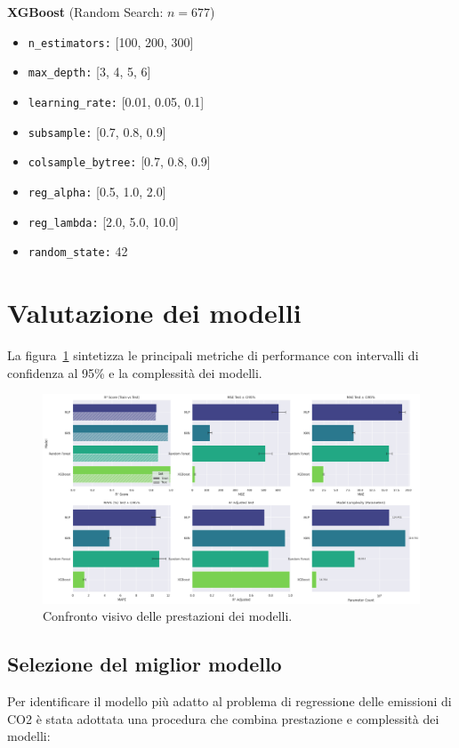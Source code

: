 \documentclass[a4paper,12pt]{report}
\begin{document}
	\smallskip
	\noindent\textbf{XGBoost} \quad (Random Search: $n=677$)
	\begin{itemize}
		\item \texttt{n\_estimators:} [100, 200, 300]
		\item \texttt{max\_depth:} [3, 4, 5, 6]
		\item \texttt{learning\_rate:} [0.01, 0.05, 0.1]
		\item \texttt{subsample:} [0.7, 0.8, 0.9]
		\item \texttt{colsample\_bytree:} [0.7, 0.8, 0.9]
		\item \texttt{reg\_alpha:} [0.5, 1.0, 2.0]
		\item \texttt{reg\_lambda:} [2.0, 5.0, 10.0]
		\item \texttt{random\_state:} 42
	\end{itemize}
	
	\section{Valutazione dei modelli}
	
	La figura~\ref{fig:comparison_models} sintetizza le principali metriche di performance con intervalli di confidenza al 95\% e la complessità dei modelli.
	
	\begin{figure}[H]
		\centering
		\includegraphics[width=1.0\textwidth]{img/comparison_car.png}
		\caption{Confronto visivo delle prestazioni dei modelli.}
		\label{fig:comparison_models}
	\end{figure}
	
	\subsection{Selezione del miglior modello}
	Per identificare il modello più adatto al problema di regressione delle emissioni di CO2 è stata adottata una procedura che combina prestazione e complessità dei modelli:
	
\end{document}
